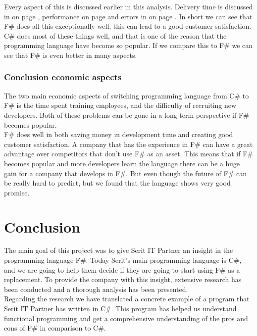 \documentclass[12pt, a4paper]{article}
\begin{document}
Every aspect of this is discussed earlier in this analysis. Delivery time is discussed in  on page \pageref{developmentTime}, performance on page \pageref{AnalysisPerformance} and errors in  on page \pageref{debug}. In short we can see that F\# does all this exceptionally well, this can lead to a good customer satisfaction.\\

C\# does most of these things well, and that is one of the reason that the programming language have become so popular. If we compare this to F\# we can see that F\# is even better in many aspects.

\newpage
\subsubsection{Conclusion economic aspects}
The two main economic aspects of switching programming language from C\# to F\# is the time spent training employees, and the difficulty of recruiting new developers. Both of these problems can be gone in a long term perspective if F\# becomes popular.\\

F\# does well in both saving money in development time and creating good customer satisfaction. A company that has the experience in F\# can have a great advantage over competitors that don't use F\# as an asset. This means that if F\# becomes popular and more developers learn the language there can be a huge gain for a company that develops in F\#. But even though the future of F\# can be really hard to predict, but we found that the language shows very good promise.

\newpage

\section{Conclusion}
The main goal of this project was to give Serit IT Partner an insight in the programming language F\#. Today Serit's main programming language is C\#, and we are going to help them decide if they are going to start using F\# as a replacement. To provide the company with this insight, extensive research has been conducted and a thorough analysis has been presented.\\

Regarding the research we have translated a concrete example of a program that Serit IT Partner has written in C\#. This program has helped us understand functional programming and get a comprehensive understanding of the pros and cons of F\# in comparison to C\#.\\
\end{document}

